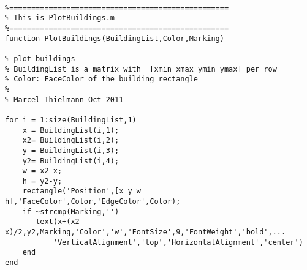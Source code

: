 \lstset{basicstyle=\footnotesize\ttfamily}
    
\begin{lstlisting}[breaklines]

%==================================================
% This is PlotBuildings.m
%==================================================
function PlotBuildings(BuildingList,Color,Marking)

% plot buildings
% BuildingList is a matrix with  [xmin xmax ymin ymax] per row
% Color: FaceColor of the building rectangle
%
% Marcel Thielmann Oct 2011

for i = 1:size(BuildingList,1)
    x = BuildingList(i,1);
    x2= BuildingList(i,2);
    y = BuildingList(i,3);
    y2= BuildingList(i,4);
    w = x2-x;
    h = y2-y;
    rectangle('Position',[x y w h],'FaceColor',Color,'EdgeColor',Color);
    if ~strcmp(Marking,'')
       text(x+(x2-x)/2,y2,Marking,'Color','w','FontSize',9,'FontWeight','bold',...
           'VerticalAlignment','top','HorizontalAlignment','center') 
    end
end


\end{lstlisting}